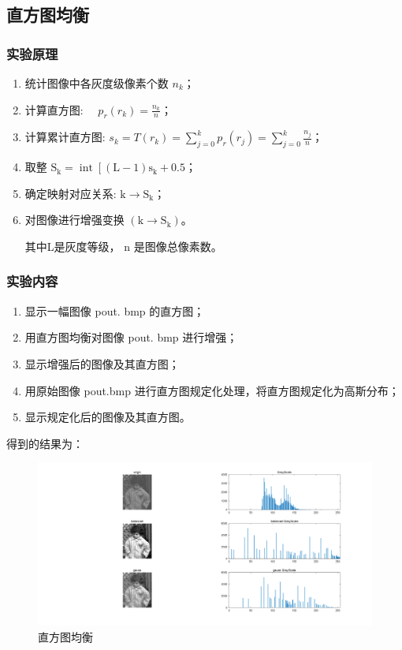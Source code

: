 \documentclass{ctexart}
\begin{document}
\subsection{\hei 直方图均衡}
\subsubsection{\hei 实验原理}
\begin{enumerate}
    \item 统计图像中各灰度级像素个数 $n_{k}$；
    \item 计算直方图: $\quad p_{r}\left(r_{k}\right)=\frac{n_{k}}{n}$；
    \item 计算累计直方图: $s_{k}=T\left(r_{k}\right)=\sum_{j=0}^{k} p_{r}\left(r_{j}\right)=\sum_{j=0}^{k} \frac{n_{j}}{n}$；
    \item 取整 $\mathrm{S}_{\mathrm{k}}=\operatorname{int}\left[(\mathrm{L}-1) \mathrm{s}_{\mathrm{k}}+\mathrm{0 . 5}\right.$；
    \item 确定映射对应关系: $\mathrm{k} \rightarrow \mathrm{S}_{\mathrm{k}}$；
    \item 对图像进行增强变换 $\left(\mathrm{k} \rightarrow \mathrm{S}_{\mathrm{k}}\right)$。\par
其中L是灰度等级， $\mathrm{n}$ 是图像总像素数。
\end{enumerate}
\subsubsection{\hei 实验内容}
\begin{enumerate}
    \item 显示一幅图像 pout. bmp 的直方图；
    \item 用直方图均衡对图像 pout. bmp 进行增强；
    \item 显示增强后的图像及其直方图；
    \item 用原始图像 pout.bmp 进行直方图规定化处理，将直方图规定化为高斯分布；
    \item 显示规定化后的图像及其直方图。
\end{enumerate}
\par 得到的结果为：
\begin{figure}[H]
    \centering
    \includegraphics[scale=0.3]{2_4.png}
    \caption{直方图均衡}
\end{figure} 
\end{document}
